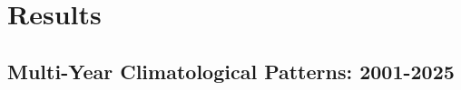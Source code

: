 

\ifpdf
\graphicspath{{Chapter4/Figs/Raster/}{Chapter4/Figs/PDF/}{Chapter4/Figs/}}
\else
\graphicspath{{Chapter4/Figs/Vector/}{Chapter4/Figs/}}
\fi

\chapter{Results}
\label{ch:results}

\section{Multi-Year Climatological Patterns: 2001-2025}
\label{sec:results_multiyear}

